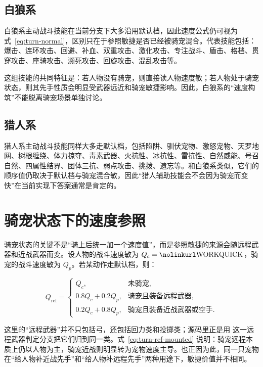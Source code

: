 \subsection{白狼系}

白狼系主动战斗技能在当前分支下大多沿用默认档，因此速度公式仍可视为式~\eqref{eq:turn-normal}，区别只在于参照敏捷是否已经被骑宠混合。代表技能包括：爆击、连环攻击、回避、补血、双重攻击、激化攻击、专注战斗、盾击、格档、贯穿攻击、座骑攻击、濒死攻击、回旋攻击、混乱攻击等。

这组技能的共同特征是：若人物没有骑宠，则直接读人物速度敏；若人物处于骑宠状态，则其先手性质会明显受武器远近和骑宠敏捷影响。因此，白狼系的“速度构筑”不能脱离骑宠场景单独讨论。

\subsection{猎人系}

猎人系主动战斗技能同样大多走默认档，包括陷阱、驯伏宠物、激怒宠物、天罗地网、树根缠绕、体力掠夺、毒素武器、火抗性、冰抗性、雷抗性、自然威能、号召自然、四属性结界、团体三抗、弱点攻击、挑拨、遗忘等。和白狼系类似，它们的顺序值仍取决于默认档与骑宠混合敏，因此“猎人辅助技能会不会因为骑宠而变快”在当前实现下答案通常是肯定的。

\section{骑宠状态下的速度参照}

骑宠状态的关键不是“骑上后统一加一个速度值”，而是参照敏捷的来源会随远程武器和近战武器而变。设人物的战斗速度敏为 $Q_c=\code{WORKQUICK}$，骑宠的战斗速度敏为 $Q_p$。若某动作走默认档，则：

\begin{equation}
    Q_{\mathrm{ref}}=
    \begin{cases}
        Q_c, & \text{未骑宠},\\[4pt]
        0.8Q_c+0.2Q_p, & \text{骑宠且装备远程武器},\\[4pt]
        0.2Q_c+0.8Q_p, & \text{骑宠且装备近战武器或空手}.
    \end{cases}
    \label{eq:turn-ref-mounted}
\end{equation}

这里的“远程武器”并不只包括弓，还包括回力类和投掷类；源码里正是用  这一远程武器判定分支把它们归到同一类。式~\eqref{eq:turn-ref-mounted} 说明：骑宠远程本质上仍以人物为主，骑宠近战则明显转为宠物速度主导。也正因为此，同一只宠物在“给人物补近战先手”和“给人物补远程先手”两种用途下，敏捷价值并不相同。

